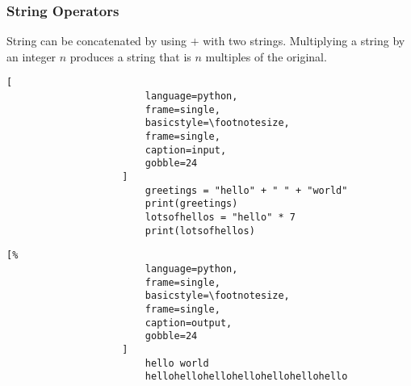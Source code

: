 \documentclass[crop=false,class=book]{standalone}
\begin{document}
            \subsubsection{String Operators}
                String can be concatenated by using $+$ with two
                strings. Multiplying a string by an integer $n$
                produces a string that is $n$ multiples of the
                original.\newline
                \begin{minipage}[t]{.48\textwidth}
                    \centering
                    \begin{lstlisting}[
                        language=python,
                        frame=single,
                        basicstyle=\footnotesize,
                        frame=single,
                        caption=input,
                        gobble=24
                    ]
                        greetings = "hello" + " " + "world"
                        print(greetings)
                        lotsofhellos = "hello" * 7
                        print(lotsofhellos)
                    \end{lstlisting}
                \end{minipage}\hfill
                \begin{minipage}[t]{.48\textwidth}
                    \centering
                    \begin{lstlisting}[%
                        language=python,
                        frame=single,
                        basicstyle=\footnotesize,
                        frame=single,
                        caption=output,
                        gobble=24
                    ]
                        hello world
                        hellohellohellohellohellohellohello
                    \end{lstlisting}
                \end{minipage}
\end{document}
